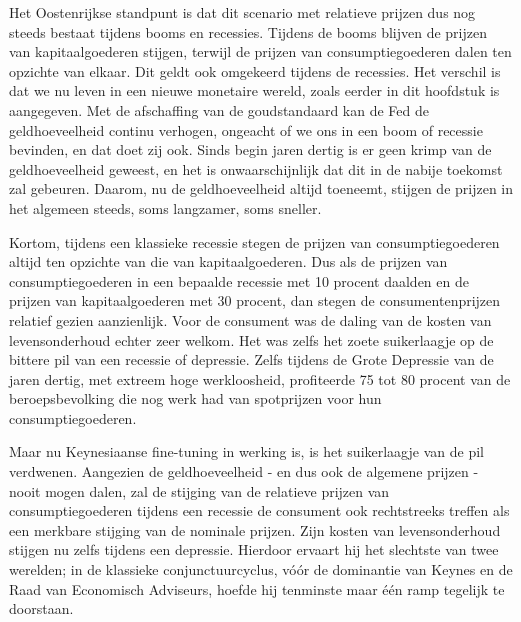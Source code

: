 \documentclass[
  a5paper,
  smalldemyvopaper,10pt,twoside,onecolumn,openright,extrafontsizes,hidelinks]{memoir}
\begin{document}
Het Oostenrijkse standpunt is dat dit scenario met relatieve prijzen dus
nog steeds bestaat tijdens booms en recessies. Tijdens de booms blijven
de prijzen van kapitaalgoederen stijgen, terwijl de prijzen van
consumptiegoederen dalen ten opzichte van elkaar. Dit geldt ook
omgekeerd tijdens de recessies. Het verschil is dat we nu leven in een
nieuwe monetaire wereld, zoals eerder in dit hoofdstuk is aangegeven.
Met de afschaffing van de goudstandaard kan de Fed de geldhoeveelheid
continu verhogen, ongeacht of we ons in een boom of recessie bevinden,
en dat doet zij ook. Sinds begin jaren dertig is er geen krimp van de
geldhoeveelheid geweest, en het is onwaarschijnlijk dat dit in de nabije
toekomst zal gebeuren. Daarom, nu de geldhoeveelheid altijd toeneemt,
stijgen de prijzen in het algemeen steeds, soms langzamer, soms sneller.

Kortom, tijdens een klassieke recessie stegen de prijzen van
consumptiegoederen altijd ten opzichte van die van kapitaalgoederen. Dus
als de prijzen van consumptiegoederen in een bepaalde recessie met 10
procent daalden en de prijzen van kapitaalgoederen met 30 procent, dan
stegen de consumentenprijzen relatief gezien aanzienlijk. Voor de
consument was de daling van de kosten van levensonderhoud echter zeer
welkom. Het was zelfs het zoete suikerlaagje op de bittere pil van een
recessie of depressie. Zelfs tijdens de Grote Depressie van de jaren
dertig, met extreem hoge werkloosheid, profiteerde 75 tot 80 procent van
de beroepsbevolking die nog werk had van spotprijzen voor hun
consumptiegoederen.

Maar nu Keynesiaanse fine-tuning in werking is, is het suikerlaagje van
de pil verdwenen. Aangezien de geldhoeveelheid - en dus ook de algemene
prijzen - nooit mogen dalen, zal de stijging van de relatieve prijzen
van consumptiegoederen tijdens een recessie de consument ook
rechtstreeks treffen als een merkbare stijging van de nominale prijzen.
Zijn kosten van levensonderhoud stijgen nu zelfs tijdens een depressie.
Hierdoor ervaart hij het slechtste van twee werelden; in de klassieke
conjunctuurcyclus, vóór de dominantie van Keynes en de Raad van
Economisch Adviseurs, hoefde hij tenminste maar één ramp tegelijk te
doorstaan.
\end{document}
